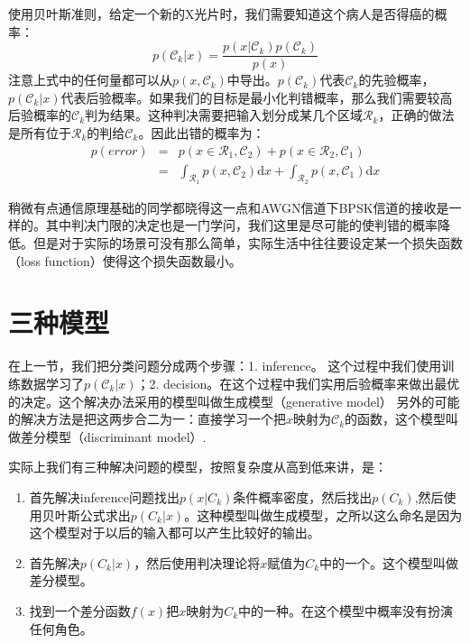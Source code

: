 \documentclass[10pt,a4paper,UTF8]{article}
\begin{document}
使用贝叶斯准则，给定一个新的X光片时，我们需要知道这个病人是否得癌的概率：
\begin{equation}
\label{eq:1}
p(\mathcal{C}_{k}|x) = \frac{p(x| \mathcal{C}_{k} ) p( \mathcal{C}_{k} )}{p(x)}
\end{equation}
注意上式中的任何量都可以从\(p(x, \mathcal{C}_{k} )\)中导出。\(p( \mathcal{C}_{k} )\)代表\(\mathcal{C}_{k}\)的先验概率，\(p( \mathcal{C}_{k} | x )\)代表后验概率。如果我们的目标是最小化判错概率，那么我们需要较高后验概率的\(\mathcal{C}_{k}\)判为结果。这种判决需要把输入划分成某几个区域\(\mathcal{R}_{k}\)，正确的做法是所有位于\(\mathcal{R}_{k}\)的判给\(\mathcal{C}_{k}\)。因此出错的概率为：
\begin{eqnarray}
\label{eq:2}
p(error)&=& p(x\in \mathcal{R}_{1}, \mathcal{C}_{2}) + p(x\in \mathcal{R}_{2}, \mathcal{C}_{1}) \\
&=& \int_{ \mathcal{R}_{1} }p(x, \mathcal{C}_{2} ) \mathrm{d}x + \int_{ \mathcal{R}_{2} } p(x, \mathcal{C}_{1} ) \mathrm{d}x
\end{eqnarray}

稍微有点通信原理基础的同学都晓得这一点和AWGN信道下BPSK信道的接收是一样的。其中判决门限的决定也是一门学问，我们这里是尽可能的使判错的概率降低。但是对于实际的场景可没有那么简单，实际生活中往往要设定某一个损失函数（loss function）使得这个损失函数最小。

\section{三种模型}
\label{sec:orgf860091}


在上一节，我们把分类问题分成两个步骤：1. inference。 这个过程中我们使用训练数据学习了\(p(\mathcal{C}_{k}|x)\)；2. decision。在这个过程中我们实用后验概率来做出最优的决定。这个解决办法采用的模型叫做生成模型（generative model）  另外的可能的解决方法是把这两步合二为一：直接学习一个把\(x\)映射为\(\mathcal{C}_{k}\)的函数，这个模型叫做差分模型（discriminant model）.

实际上我们有三种解决问题的模型，按照复杂度从高到低来讲，是：
\begin{enumerate}
\item 首先解决inference问题找出\(p(x|C_{k})\)条件概率密度，然后找出\(p(C_{k})\),然后使用贝叶斯公式求出\(p(C_{k}|x)\)。这种模型叫做生成模型，之所以这么命名是因为这个模型对于以后的输入都可以产生比较好的输出。
\item 首先解决\(p(C_{k}|x)\)，然后使用判决理论将\(x\)赋值为\(C_{k}\)中的一个。这个模型叫做差分模型。
\item 找到一个差分函数\(f(x)\)把\(x\)映射为\(C_{k}\)中的一种。在这个模型中概率没有扮演任何角色。
\end{enumerate}
\end{document}
